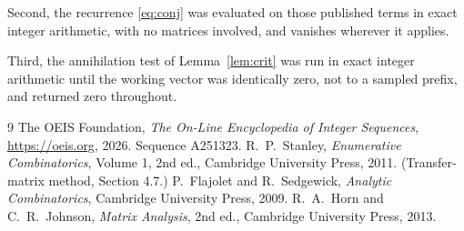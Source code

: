 \documentclass[11pt,a4paper]{article}
\theoremstyle{plain}
\theoremstyle{definition}
\begin{document}
Second, the recurrence \eqref{eq:conj} was evaluated on those published terms in exact
integer arithmetic, with no matrices involved, and vanishes wherever it applies.

Third, the annihilation test of Lemma~\ref{lem:crit} was run in exact integer arithmetic
until the working vector was identically zero, not to a sampled prefix, and returned zero
throughout.

\begin{thebibliography}{9}
 The OEIS Foundation, \emph{The On-Line Encyclopedia of Integer
Sequences}, \url{https://oeis.org}, 2026. Sequence A251323.
 R.~P.~Stanley, \emph{Enumerative Combinatorics}, Volume 1, 2nd ed.,
Cambridge University Press, 2011. (Transfer-matrix method, Section 4.7.)
 P.~Flajolet and R.~Sedgewick, \emph{Analytic Combinatorics}, Cambridge
University Press, 2009.
 R.~A.~Horn and C.~R.~Johnson, \emph{Matrix Analysis}, 2nd ed., Cambridge
University Press, 2013.
\end{thebibliography}
\end{document}
